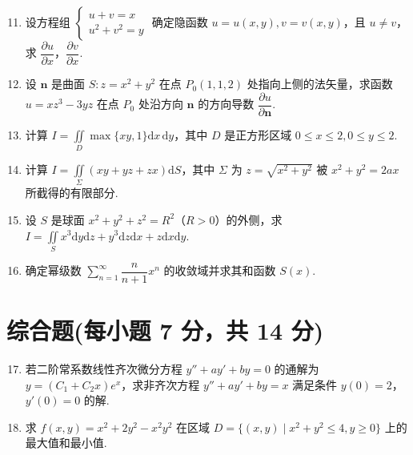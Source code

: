 \documentclass[../Main.tex]{subfiles}
\begin{document}
\begin{enumerate}
    \setcounter{enumi}{10}
    \item 设方程组 \( \begin{cases} u + v = x \\ u^2 + v^2 = y \end{cases} \) 确定隐函数 \( u = u(x,y), v = v(x,y) \)，且 \( u \neq v \)，求 \( \dfrac{\partial u}{\partial x} \)，\( \dfrac{\partial v}{\partial x} \).
          \vspace{9em}

    \item 设 \( \boldsymbol{n} \) 是曲面 \( S: z = x^2 + y^2 \) 在点 \( P_0(1,1,2) \) 处指向上侧的法矢量，求函数 \( u = xz^3 - 3yz \) 在点 \( P_0 \) 处沿方向 \( \boldsymbol{n} \) 的方向导数 \( \dfrac{\partial u}{\partial \boldsymbol{n}} \).
          \vspace{9em}

    \item 计算 \( I = \displaystyle \iint \limits_D \max\{xy, 1\} \mathrm{d}x\,\mathrm{d}y \)，其中 \( D \) 是正方形区域 \( 0 \leq x \leq 2, 0 \leq y \leq 2 \).
          \vspace{9em}

    \item 计算 \( I = \displaystyle \iint \limits_{\Sigma} (xy + yz + zx) \mathrm{d}S \)，其中 \( \Sigma \) 为 \( z = \sqrt{x^2 + y^2} \) 被 \( x^2 + y^2 = 2ax \) 所截得的有限部分.
          \vspace{9em}

    \item 设 \( S \) 是球面 \( x^2 + y^2 + z^2 = R^2 \)（\( R > 0 \)）的外侧，求 \( I = \displaystyle \iint \limits_S x^3 \mathrm{d}y \mathrm{d}z + y^3 \mathrm{d}z \mathrm{d}x + z \mathrm{d}x \mathrm{d}y \).
          \vspace{9em}

    \item 确定幂级数 \( \sum \limits_{n=1}^{\infty} \dfrac{n}{n+1} x^n \) 的收敛域并求其和函数 \( S(x) \).
          \vspace{9em}
\end{enumerate}

\section{综合题(每小题 7 分，共 14 分)}
\begin{enumerate}
    \setcounter{enumi}{16}
    \item 若二阶常系数线性齐次微分方程 \( y'' + ay' + by = 0 \) 的通解为 \( y = (C_1 + C_2 x)e^x \)，求非齐次方程 \( y'' + ay' + by = x \) 满足条件 \( y(0) = 2 \)，\( y'(0) = 0 \) 的解.
          \vspace{10em}

    \item 求 \( f(x, y) = x^2 + 2y^2 - x^2 y^2 \) 在区域 \( D = \{(x, y) \mid x^2 + y^2 \leq 4, y \geq 0\} \) 上的最大值和最小值.
          \vspace{10em}
\end{enumerate}
\end{document}
